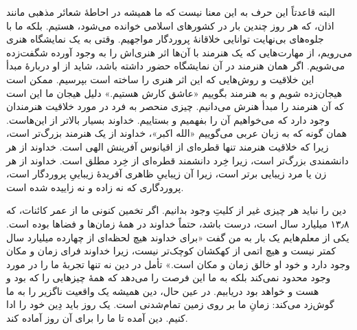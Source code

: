 البته قاعدتاً این حرف به این معنا نیست که ما همیشه در احاطهٔ شعائر مذهبی مانند اذان، که هر روز چندین بار در کشورهای اسلامی خوانده می‌شود، هستیم. بلکه ما با جلوه‌های بی‌نهایت توانایی خلاقانهٔ پروردگار مواجهیم. وقتی به یک نمایشگاه هنری می‌رویم،‌ از مهارت‌هایی که یک هنرمند با آن‌ها اثر هنری‌اش را به وجود آورده شگفت‌زده می‌شویم. اگر همان هنرمند در آن نمایشگاه حضور داشته باشد، شاید از او دربارهٔ مبدأ این خلاقیت و روش‌هایی که این اثر هنری را ساخته است بپرسیم. ممکن است هیجان‌زده شویم و به هنرمند بگوییم «عاشق کارش هستیم.»  دلیل  هیجان ما این است که آن هنرمند را مبدأ  هنرش می‌دانیم. چیزی منحصر به فرد در مورد خلاقیت هنرمندان وجود دارد که می‌خواهیم آن را بفهمیم و بستاییم. خداوند بسیار بالاتر از این‌هاست. همان گونه که به زبان عربی می‌گوییم  «الله اکبر»، خداوند از یک هنرمند بزرگ‌تر است، زیرا که خلاقیت هنرمند تنها قطره‌ای از اقیانوس آفرینش الهی است. خداوند از هر دانشمندی بزرگ‌تر است، زیرا خِرد  دانشمند قطره‌ای از خِرد مطلق است. خداوند از هر زن یا مرد زیبایی برتر است، زیرا آن زیباییِ ظاهری آفریدهٔ زیباییِ پروردگار است، پروردگاری که نه زاده و نه زاییده شده است. 

دین را نباید هر چیزی غیر از کلیتِ وجود بدانیم. اگر تخمین کنونی ما از عمر کائنات، که ۱۳٫۸ میلیارد سال است، درست باشد، حتماً خداوند در همهٔ زمان‌ها و فضاها بوده است. یکی از معلم‌هایم یک بار به من گفت «برای خداوند هیچ لحظه‌ای از چهارده میلیارد سال کمتر نیست و هیچ اتمی از کهکشان کوچک‌تر نیست، زیرا خداوند فرای زمان و مکان وجود دارد و خود او خالق زمان و مکان است.» تأمل در دین نه تنها تجربه‌ٔ ما را در مورد وجود محدود نمی‌کند بلکه به ما این فرصت را می‌دهد که همهٔ‌ چیزهایی را که بود و هست و خواهد بود دریابیم. در عین حال، دین همیشه یک واقعیت ناگزیر را به ما گوش‌زد می‌کند: زمانِ ما بر روی زمین تمام‌شدنی است. یک روز باید دِین خود را ادا کنیم. دین آمده تا ما را برای آن روز آماده کند. 








